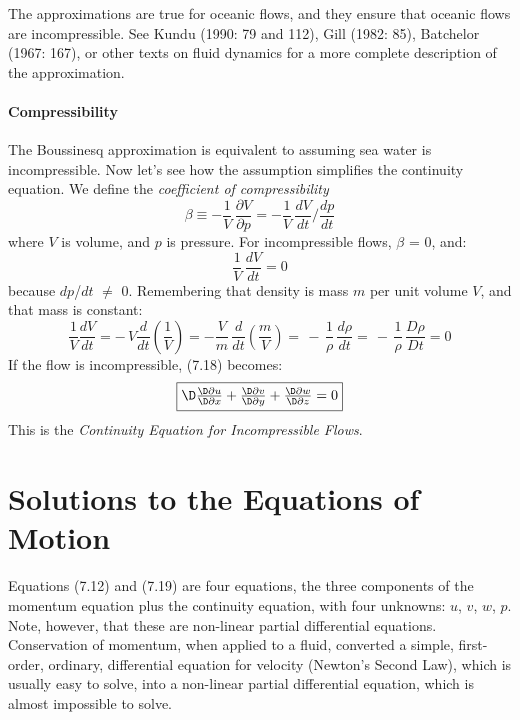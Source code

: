 The approximations are true for oceanic flows, and they ensure that
oceanic flows are incompressible. See Kundu (1990: 79 and 112), Gill
(1982: 85), Batchelor (1967: 167), or other texts on fluid dynamics
for a more complete description of the approximation.

\paragraph{Compressibility}
The Boussinesq
approximation is equivalent to assuming sea water is
incompressible. Now let's see how the assumption simplifies the
continuity equation. We define the \textit{coefficient of
  compressibility}
\begin{displaymath}
\beta \equiv -\frac{1}{V}\,\frac{\partial{V}}{\partial{p}} =
-\frac{1}{V}\,\frac{dV}{dt}\Big/\frac{dp}{dt}
\end{displaymath}
where $V$ is volume, and $p$ is pressure. For incompressible flows,
$\beta$ = 0, and:
\begin{displaymath}
\frac{1}{V}\,\frac{dV}{dt} = 0
\end{displaymath}
because $dp$/$dt$ $\not=$ 0. Remembering that density is mass $m$ per
unit volume $V$, and that mass is constant:
\begin{displaymath}
\frac{1}{V}\frac{dV}{dt} = -\,V\frac{d}{dt}\left(\frac{1}{V}\right) =
- \frac{V}{m}\,\frac{d}{dt}\left(\frac{m}{V}\right)
=\,-\,\frac{1}{\rho}\,\frac{d\rho}{dt} =\,-\,\frac{1}{\rho}\, \frac{D\rho}{Dt} = 0
\end{displaymath}
If the flow is incompressible, (7.18) becomes:
\begin{equation}
\fbox{$ \D
\frac{\D\partial{u}}{\D\partial{x}} + \frac{\D\partial{v}}{\D\partial{y}} + \frac{\D\partial{w}}{\D\partial{z}} = 0 $}
\end{equation}
This is the  \textit{Continuity Equation
  for Incompressible Flows}.

\section{Solutions to the Equations of Motion}
Equations (7.12) and (7.19) are four equations, the three components
of the momentum equation plus the continuity equation, with four
unknowns: $u$, $v$, $w$, $p$. Note, however, that these are non-linear
partial differential equations.  Conservation of momentum, when
applied to a fluid, converted a simple, first-order, ordinary,
differential equation for velocity (Newton's Second Law), which is
usually easy to solve, into a non-linear partial differential
equation, which is almost impossible to solve.

